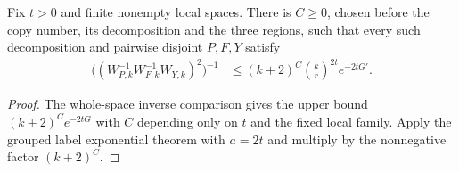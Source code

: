 \begin{theorem}
  \label{thm:grouped_replica_inverse}
  \leanok
  Fix $t>0$ and finite nonempty local spaces. There is $C\geq0$, chosen
  before the copy number, its decomposition and the three regions,
  such that every such decomposition and pairwise disjoint $P,F,Y$
  satisfy
  \begin{align}
    \bigl((W_{P,k}^{-1}W_{F,k}^{-1}W_{Y,k})^2\bigr)^{-1}
    &\leq (k+2)^C\binom{k}{r}^{2t}e^{-2tG'}.
  \end{align}
\end{theorem}
\begin{proof}\leanok
  The whole-space inverse comparison gives the upper bound
  $(k+2)^Ce^{-2tG}$ with $C$ depending only on $t$ and the fixed local
  family. Apply the grouped label exponential theorem with $a=2t$
  and multiply by the nonnegative factor $(k+2)^C$.
\end{proof}
